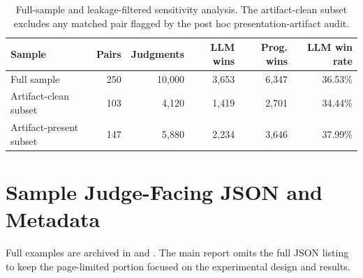 \documentclass[11pt]{article}
\begin{document}
\begin{table}[h]
\centering
\small
\begin{tabular}{lrrrrr}
\toprule
Sample & Pairs & Judgments & LLM wins & Prog. wins & LLM win rate \\
\midrule
Full sample & 250 & 10,000 & 3,653 & 6,347 & 36.53\% \\
Artifact-clean subset & 103 & 4,120 & 1,419 & 2,701 & 34.44\% \\
Artifact-present subset & 147 & 5,880 & 2,234 & 3,646 & 37.99\% \\
\bottomrule
\end{tabular}
\caption{Full-sample and leakage-filtered sensitivity analysis. The artifact-clean subset excludes any matched pair flagged by the post hoc presentation-artifact audit.}
\label{tab:leakage-app}
\end{table}

\section{Sample Judge-Facing JSON and Metadata}
\label{app:samples}
Full examples are archived in  and . The main report omits the full JSON listing to keep the page-limited portion focused on the experimental design and results.
\end{document}
